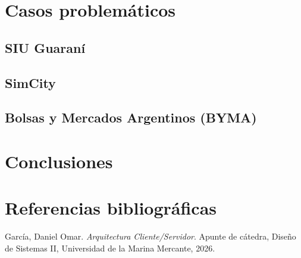 \documentclass[
  spanish,
  11pt,
]{article}
\newlength{\cslhangindent}
\newenvironment{CSLReferences}[2] %
 {\begin{list}{}{%
  \setlength{\itemindent}{0pt}
  \setlength{\leftmargin}{0pt}
  \setlength{\parsep}{0pt}
  \ifodd #1
   \setlength{\leftmargin}{\cslhangindent}
   \setlength{\itemindent}{-1\cslhangindent}
  \fi
  \setlength{\itemsep}{#2\baselineskip}}}
 {\end{list}}
\begin{document}
\section{Casos problemáticos}\label{casos-problemuxe1ticos}

\subsection{SIU Guaraní}\label{siu-guaranuxed}

\subsection{SimCity}\label{simcity}

\subsection{Bolsas y Mercados Argentinos
(BYMA)}\label{bolsas-y-mercados-argentinos-byma}

\section{Conclusiones}\label{conclusiones}

\section*{Referencias
bibliográficas}\label{referencias-bibliogruxe1ficas}

\protect{}\label{refs}
\begin{CSLReferences}{1}{1}
García, Daniel Omar. \emph{Arquitectura Cliente/Servidor}. Apunte de
cátedra, Diseño de Sistemas II, Universidad de la Marina Mercante, 2026.

\end{CSLReferences}
\end{document}
